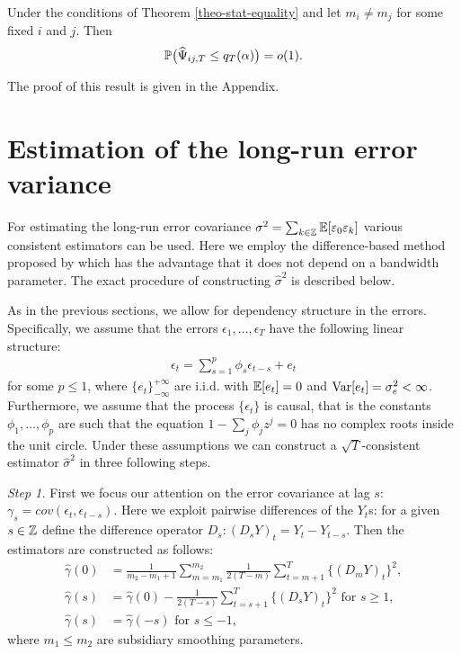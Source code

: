 \documentclass[a4paper,12pt]{article}
\numberwithin{equation}{section}
\begin{document}
\begin{corollary}\label{corollary-test-equality-3}
Under the conditions of Theorem \ref{theo-stat-equality} and let $m_i \ne m_j$ for some fixed $i$ and $j$. Then  
\[ \mathbb{P} \big( \widehat{\Psi}_{ij,T} \le q_T(\alpha) \big) = o(1). \]
\end{corollary}
The proof of this result is given in the Appendix.



\newpage
\section{Estimation of the long-run error variance}\label{sec-error-var}

For estimating the long-run error covariance $\sigma^2 = \sum_{k \in \mathbb{Z}} \mathbb{E}[\varepsilon_0 \varepsilon_k]$ various consistent estimators can be used. Here we employ the difference-based method proposed by \cite{Hall2003} which has the advantage that it does not depend on a bandwidth parameter. The exact procedure of constructing $\hat{\sigma}^2$ is described below.

As in the previous sections, we allow for dependency structure in the errors. Specifically, we assume that the errors $\epsilon_1, \ldots, \epsilon_T$ have the following linear structure:
\begin{align*}
\epsilon_t = \sum_{s=1}^{p} \phi_s \epsilon_{t-s} + e_t
\end{align*}
for some $p \le 1$, where $\{e_t\}_{-\infty}^{+\infty}$ are i.i.d. with $\mathbb{E}[e_t] = 0$ and $\textnormal{Var}[e_t] = \sigma^2_e < \infty$. Furthermore, we assume that the process $\{\epsilon_t\}$ is causal, that is the constants $\phi_1, \ldots, \phi_p$ are such that the equation $1-\sum_{j}\phi_j z^j = 0$ has no complex roots inside the unit circle. Under these assumptions we can construct a $\sqrt{T}$-consistent estimator $\hat{\sigma}^2$ in three following steps.
\vspace{1pt}


\textit{Step 1.}
First we focus our attention on  the error covariance at lag $s$: $\gamma_s = cov(\epsilon_t, \epsilon_{t-s})$. Here we exploit pairwise differences of the $Y_t$s: for a given $s \in \mathbb{Z}$ define the difference operator $D_s: (D_s Y)_t = Y_t - Y_{t-s}$. Then 
the estimators are constructed as follows:
\begin{align*}
\hat{\gamma}(0) &= \frac{1}{m_2-m_1+1}\sum_{m=m_1}^{m_2}\frac{1}{2(T-m)}\sum_{t=m+1}^T\{(D_mY)_t\}^2,\\
\hat{\gamma}(s) &= \hat{\gamma}(0) - \frac{1}{2(T-s)}\sum_{t=s+1}^T \{(D_sY)_t\}^2 \text{ for } s\ge 1,\\
\hat{\gamma}(s) &= \hat{\gamma}(-s) \text{ for } s\le -1,
\end{align*}
where $m_1\le m_2$ are subsidiary smoothing parameters.
\vspace{1pt}
\end{document}
